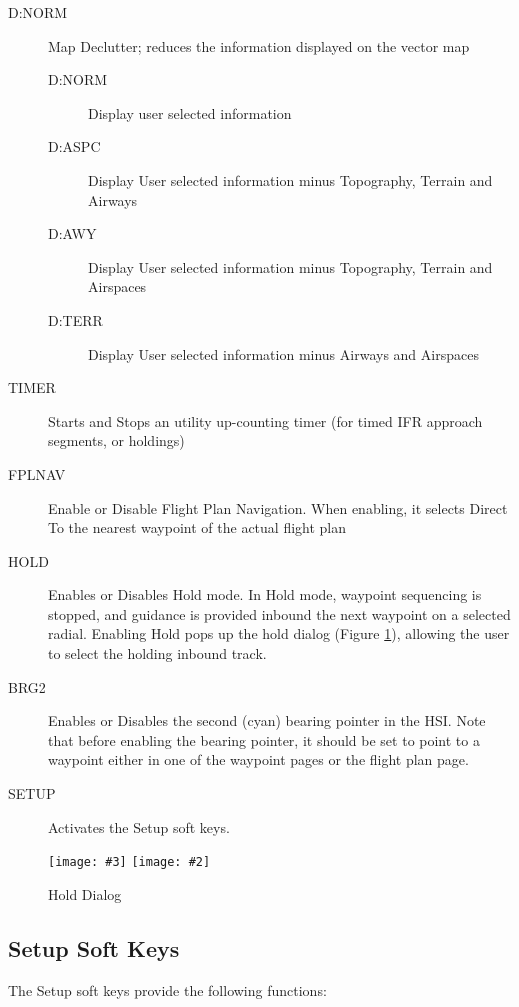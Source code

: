 \documentclass[a4paper,10pt,pdftex]{article}
\newcommand{\jnxfig}[3][]{\ifmypdf\texttt{[image: \#3]}
  \else\texttt{[image: \#2]}\fi}
\begin{document}
\begin{description}
\item[D:NORM] Map Declutter; reduces the information displayed on the
  vector map
  \begin{description}
  \item[D:NORM] Display user selected information
  \item[D:ASPC] Display User selected information minus Topography,
    Terrain and Airways
  \item[D:AWY] Display User selected information minus Topography,
    Terrain and Airspaces
  \item[D:TERR] Display User selected information minus Airways and
    Airspaces
  \end{description}
\item[TIMER] Starts and Stops an utility up-counting timer (for timed
  IFR approach segments, or holdings)
\item[FPLNAV] Enable or Disable Flight Plan Navigation. When enabling,
  it selects Direct To the nearest waypoint of the actual flight plan
\item[HOLD] Enables or Disables Hold mode. In Hold mode, waypoint
  sequencing is stopped, and guidance is provided inbound the next
  waypoint on a selected radial. Enabling Hold pops up the hold dialog
  (Figure \ref{fig:holddialog}), allowing the user to select the
  holding inbound track.
\item[BRG2] Enables or Disables the second (cyan) bearing pointer in
  the HSI. Note that before enabling the bearing pointer, it should be
  set to point to a waypoint either in one of the waypoint pages or
  the flight plan page.
\item[SETUP] Activates the Setup soft keys.
\end{description}

\begin{figure}[!htbp]
  \begin{center}
    \jnxfig[scale=0.5]{holddialog.eps}{holddialog.png}
    \caption{Hold Dialog}
    \label{fig:holddialog}
  \end{center}
\end{figure}

\subsection{Setup Soft Keys}

The Setup soft keys provide the following functions:
\end{document}

